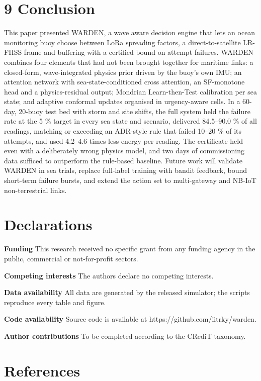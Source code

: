 \documentclass[
  11pt,
]{article}
\begin{document}
\hypertarget{conclusion}{%
\section{9 Conclusion}\label{conclusion}}

This paper presented WARDEN, a wave aware decision engine that lets an
ocean monitoring buoy choose between LoRa spreading factors, a
direct-to-satellite LR-FHSS frame and buffering with a certified bound
on attempt failures. WARDEN combines four elements that had not been
brought together for maritime links: a closed-form, wave-integrated
physics prior driven by the buoy's own IMU; an attention network with
sea-state-conditioned cross attention, an SF-monotone head and a
physics-residual output; Mondrian Learn-then-Test calibration per sea
state; and adaptive conformal updates organised in urgency-aware cells.
In a 60-day, 20-buoy test bed with storm and site shifts, the full
system held the failure rate at the 5 \% target in every sea state and
scenario, delivered 84.5--90.0 \% of all readings, matching or exceeding
an ADR-style rule that failed 10--20 \% of its attempts, and used
4.2--4.6 times less energy per reading. The certificate held even with a
deliberately wrong physics model, and two days of commissioning data
sufficed to outperform the rule-based baseline. Future work will
validate WARDEN in sea trials, replace full-label training with bandit
feedback, bound short-term failure bursts, and extend the action set to
multi-gateway and NB-IoT non-terrestrial links.

\hypertarget{declarations}{%
\section{Declarations}\label{declarations}}

\textbf{Funding} This research received no specific grant from any funding agency in the public, commercial or not-for-profit sectors.

\textbf{Competing interests} The authors declare no competing interests.

\textbf{Data availability} All data are generated by the released
simulator; the scripts reproduce every table and figure.

\textbf{Code availability} Source code is available at
https://github.com/iitrky/warden.

\textbf{Author contributions} To be completed according to the CRediT
taxonomy.

\hypertarget{references}{%
\section{References}\label{references}}
\end{document}
